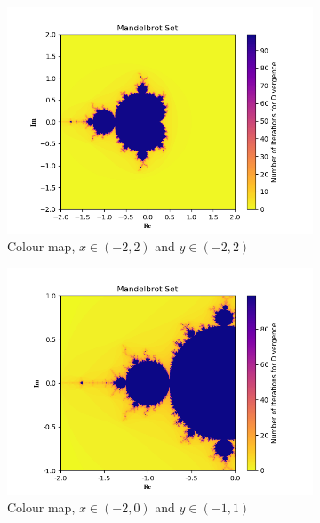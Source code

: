 \documentclass{article}
\begin{document}
\begin{figure}[H]
\centering
\begin{subfigure}{.5\textwidth}
  \centering
  \includegraphics[width=\textwidth]{Mandelbrot_1.png}
  \caption{Colour map, $x \in (-2,2)$ and $y \in (-2,2)$}
  \label{fig:sub1}
\end{subfigure}%
\begin{subfigure}{.5\textwidth}
  \centering
  \includegraphics[width=\textwidth]{Mandelbrot_2.png}
  \caption{Colour map, $x \in (-2,0)$ and $y \in (-1,1)$}
  \label{fig:sub2}
\end{subfigure}
\begin{subfigure}{.5\textwidth}
  \centering

\end{subfigure}
\end{figure}
\end{document}
